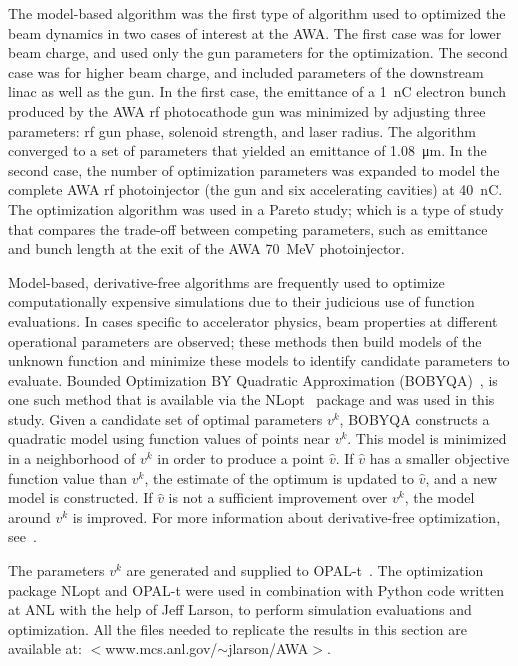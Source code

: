 The model-based algorithm was the first type of algorithm used to optimized the beam dynamics 
in two cases of interest at the AWA.
The first case was for lower beam charge, and used only the gun parameters for the optimization.  
The second case was for higher beam charge, and included parameters of the downstream linac as well as the gun.
In the first case,  the emittance of a \SI{1}{nC} electron 
bunch produced by the AWA rf photocathode gun 
was minimized by adjusting three parameters: rf gun phase, 
solenoid strength, and laser radius. The algorithm 
converged to a set of parameters that yielded an
emittance of \SI{1.08}{\um}. In the second case, 
the number of optimization parameters was expanded to model the complete AWA rf 
photoinjector (the gun and six accelerating cavities) at \SI{40}{nC}. 
The optimization algorithm was used in a Pareto study; which is a type of study that compares the 
trade-off between competing parameters, such as emittance and bunch 
length at the exit of the AWA \SI{70}{MeV} photoinjector. 

Model-based, derivative-free algorithms are frequently used to optimize
computationally expensive simulations due to their judicious use of function
evaluations. In cases specific to accelerator physics, 
beam properties at different operational parameters are observed;
these methods then build models of the unknown
function and minimize these models to identify candidate parameters to 
evaluate. Bounded Optimization BY Quadratic Approximation (BOBYQA)~\cite{bobyqa},
 is one such method that is available via the
NLopt~\cite{nlopt} package and was used in this study. 
Given a candidate set of optimal parameters $v^k$, BOBYQA
constructs a quadratic model using function values of points near $v^k$. 
This model is minimized in a neighborhood of $v^k$ in order to produce a point $\hat{v}$. 
If $\hat{v}$ has a smaller objective function value than $v^k$, 
the estimate of the optimum is updated to $\hat{v}$, and a new model is constructed. 
If $\hat{v}$ is not a sufficient improvement over $v^k$, 
the model around $v^k$ is improved. For more
information about derivative-free optimization, see~\cite{Conn2009a}.

The parameters $v^k$ are generated and supplied to OPAL-t~\cite{opal}. 
The optimization package NLopt and OPAL-t were used
in combination with Python code written at ANL with the help 
of Jeff Larson, to perform simulation evaluations and optimization.
All the files needed to replicate the results in this section are available at: 
$<$www.mcs.anl.gov/$\sim$jlarson/AWA$>$.  

